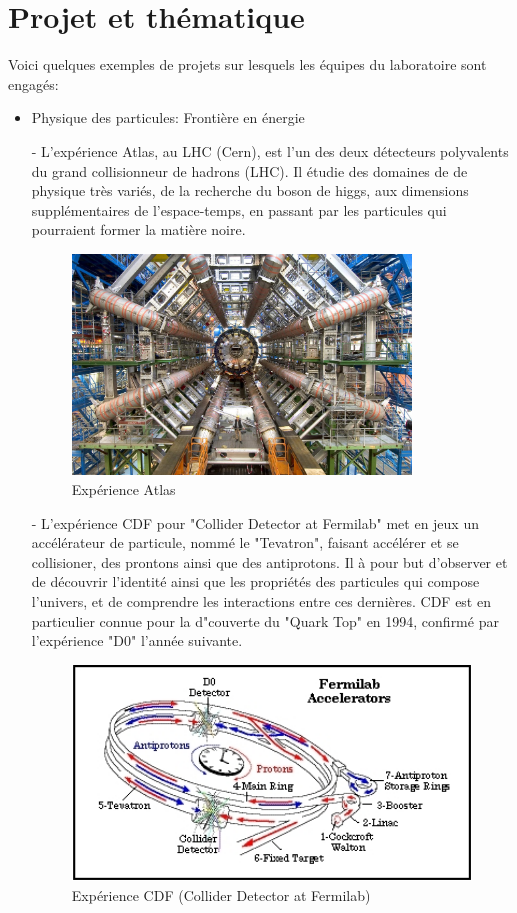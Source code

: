 \documentclass[french,a4paper,12pt]{report}
\begin{document}
  \section{Projet et thématique}
  Voici quelques exemples de projets sur lesquels les équipes du laboratoire sont engagés:
  \begin{itemize}
  \item Physique des particules: Frontière en énergie
  
  	- L'expérience Atlas, au LHC (Cern), est l'un des deux détecteurs polyvalents du grand collisionneur de hadrons (LHC). Il étudie des domaines de de physique très variés, de la recherche du boson de higgs, aux dimensions supplémentaires de l'espace-temps, en passant par les particules qui pourraient former la matière noire.
  	
  	\begin{figure}[!ht]
    \center
    \includegraphics[width=9cm]{ATLASLHC.jpg}
    \caption{Expérience Atlas}
		\end{figure}
  	
 	
 	- L'expérience CDF pour "Collider Detector at Fermilab" met en jeux un accélérateur de particule, nommé le "Tevatron", faisant accélérer et se collisioner, des prontons ainsi que des antiprotons. 	Il à pour but d'observer et de découvrir l'identité ainsi que les propriétés des particules qui compose l'univers, et de comprendre les interactions entre ces dernières.
 	CDF est en particulier connue pour la d"couverte du "Quark Top" en 1994, confirmé par l'expérience "D0" l'année suivante.
 	
	\begin{figure}[!ht]
    \center
    \includegraphics[width=11cm]{D0.jpg}
    \caption{Expérience CDF (Collider Detector at Fermilab)}
		\end{figure} 
 	

\end{itemize}
\end{document}
